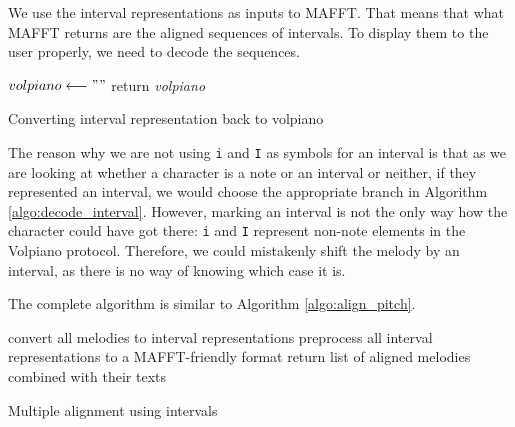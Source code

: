 We use the interval representations as inputs to MAFFT. That means that what MAFFT returns are the aligned sequences of intervals. To display them to the user
properly, we need to decode the sequences.\newline

\begin{algorithm}[H]
    \BlankLine
    $volpiano \longleftarrow ""$\;
    return \emph{volpiano}\;
    \caption{Converting interval representation back to volpiano}
    \label{algo:decode_interval}
\end{algorithm}

The reason why we are not using \verb|i| and \verb|I| as symbols for an interval is that as we are looking at whether a character is a note or an interval or neither, 
if they represented an interval, we would choose the appropriate branch in Algorithm \ref{algo:decode_interval}. However, marking an interval is not the only way how
the character could have got there: \verb|i| and \verb|I| represent non-note elements in the Volpiano protocol. Therefore, we could mistakenly shift the melody by an interval,
as there is no way of knowing which case it is.

The complete algorithm is similar to Algorithm \ref{algo:align_pitch}.\newline

\begin{algorithm}[H]
    \BlankLine
    convert all melodies to interval representations\;
    preprocess all interval representations to a MAFFT-friendly format\;
    return list of aligned melodies combined with their texts\;
    \caption{Multiple alignment using intervals}
    \label{algo:align_intervals}
\end{algorithm}

